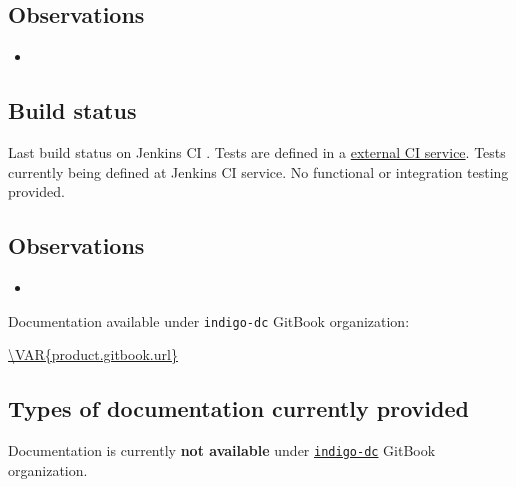 \documentclass[a4wide,11pt]{article}
\begin{document}
\subsection{Observations}
\begin{itemize}
    \item {}
\end{itemize}



\label{sec:func_int_test}


\subsection{Build status}
Last build status on Jenkins CI
\href{\VAR{job_data.job_url}}{}.
Tests are defined in a \href{\VAR{product.func_int_test.url}}{external CI service}.
Tests currently being defined at Jenkins CI service.
No functional or integration testing provided.

\subsection{Observations}
\begin{itemize}
    \item {}
\end{itemize}



\label{sec:gitbook}
Documentation available under \texttt{indigo-dc} GitBook organization: \vspace{0.1em} \begin{center}\url{\VAR{product.gitbook.url}}\end{center} 
\subsection{Types of documentation currently provided}
\begin{center}
\end{center}
Documentation is currently \textbf{not available} under \href{https://www.gitbook.com/@indigo-dc/dashboard}{\texttt{indigo-dc}} GitBook organization.
\end{document}
